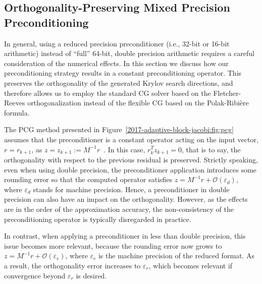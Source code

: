 \subsection{Orthogonality-Preserving Mixed Precision Preconditioning}

In general, using a reduced precision preconditioner (i.e., 32-bit or 16-bit 
arithmetic) 
instead of ``full'' 64-bit, double precision arithmetic
requires a careful consideration of the numerical effects. In this section we 
discuss how our preconditioning strategy results in a constant preconditioning
operator. This preserves the orthogonality of the 
generated Krylov search directions, 
and therefore allows us to employ the standard CG solver based on the 
Fletcher-Reeves orthogonalization instead of the flexible CG based on the 
Polak-Ribi\`{e}re formula.

The PCG method
presented in Figure~\ref{2017-adaptive-block-jacobi:fig:pcg} assumes that the preconditioner is a constant
operator acting on the input vector, $r=r_{k+1}$, as
$z=z_{k+1}:=M^{-1}r$~\cite{saad}. In this case, $r_k^Tz_{k+1}=0$, that is to 
say, the
orthogonality with respect to the previous residual is preserved. Strictly
speaking, even when using double precision, the preconditioner application
introduces some rounding error so that the computed operator satisfies
$z=M^{-1}r + \mathcal{O}(\varepsilon_d)$, where $\varepsilon_d$ stands for \fpd
machine precision. Hence, a preconditioner in double precision can also
have an impact on the orthogonality. However, as the effects are in the order of
the approximation accuracy, the non-consistency of the preconditioning operator
is typically disregarded in practice.

In contrast, when applying a preconditioner in less than double precision, 
this issue becomes more relevant, because the rounding
error now grows to $z=M^{-1}r + \mathcal{O}(\varepsilon_r)$, where
$\varepsilon_r$ is the machine precision of the reduced format. As a result, the
orthogonality error increases to $\varepsilon_r$, which becomes relevant if
convergence beyond $\varepsilon_r$ is desired.

